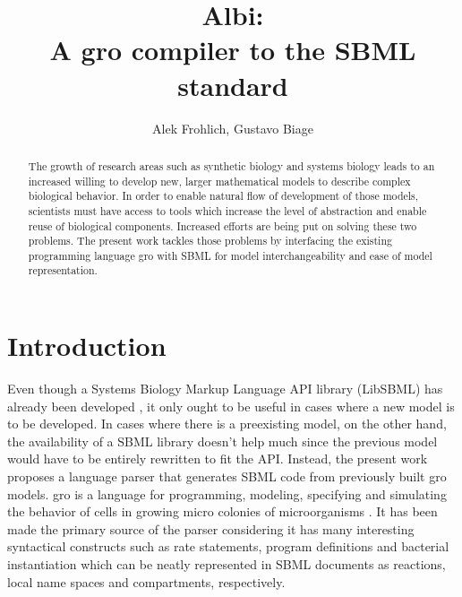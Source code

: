 \documentclass[12pt]{article}
\title{Albi:\\ A gro compiler to the SBML standard}
\author{Alek Frohlich\inst{1}, Gustavo Biage\inst{1}}
\begin{document}
\maketitle

\begin{abstract}

    The growth of research areas such as synthetic biology and systems biology leads to an increased willing to develop new, larger mathematical models to describe complex biological behavior. In order to enable natural flow of development of those models, scientists must have access to tools which increase the level of abstraction and enable reuse of biological components. Increased efforts are being put on solving these two problems. The present work tackles those problems by interfacing the existing programming language gro with SBML for model interchangeability and ease of model representation.

\end{abstract}

\section{Introduction}

    Even though a Systems Biology Markup Language API library (LibSBML) has already been developed \cite{Bornstein2008}, it only ought to be useful in cases where a new model is to be developed. In cases where there is a preexisting model, on the other hand, the availability of a SBML library doesn't help much since the previous model would have to be entirely rewritten to fit the API. Instead, the present work proposes a language parser that generates SBML code from previously built gro models. gro is a language for programming, modeling, specifying and simulating the behavior of cells in growing micro colonies of microorganisms \cite{Jang2012}. It has been made the primary source of the parser considering it has many interesting syntactical constructs such as rate statements, program definitions and bacterial instantiation which can be neatly represented in SBML documents as reactions, local name spaces and compartments, respectively.
    
\end{document}

